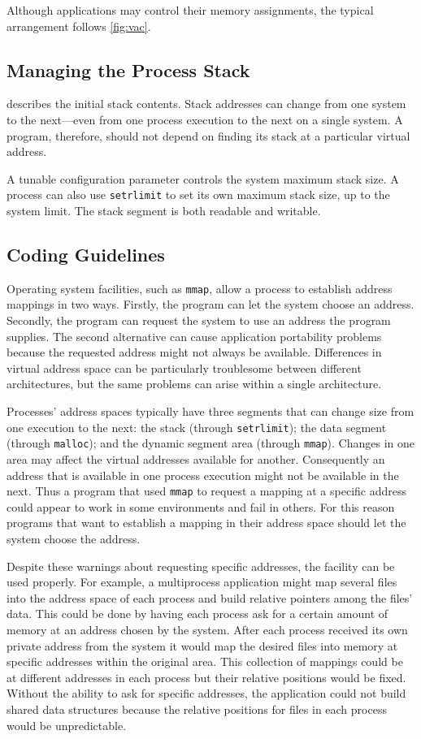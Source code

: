 \documentclass[english,11pt,twoside,toc=bib,toc=idx]{scrreprt}
\begin{document}
Although applications may control their memory assignments, the
typical arrangement follows \cref{fig:vac}.

\subsection{Managing the Process Stack}
 describes the initial stack contents.
Stack addresses can change from one system to the next---even from one
process execution to the next on a single system.  A program,
therefore, should not depend on finding its stack at a particular
virtual address.

A tunable configuration parameter controls the system maximum stack size.
A process can also use \texttt{setrlimit} to set its own maximum stack
size, up to the system limit.  The stack segment is both readable and
writable.

\subsection{Coding Guidelines}
Operating system facilities, such as \texttt{mmap}, allow a process to
establish address mappings in two ways.  Firstly, the program can let
the system choose an address.  Secondly, the program can request the
system to use an address the program supplies.  The second alternative
can cause application portability problems because the requested
address might not always be available.  Differences in virtual address
space can be particularly troublesome between different architectures,
but the same problems can arise within a single architecture.

Processes' address spaces typically have three segments that can
change size from one execution to the next: the stack (through
\texttt{setrlimit}); the data segment (through \texttt{malloc}); and
the dynamic segment area (through \texttt{mmap}).  Changes in one area
may affect the virtual addresses available for another.  Consequently
an address that is available in one process execution might not be
available in the next.  Thus a program that used \texttt{mmap} to
request a mapping at a specific address could appear to work in some
environments and fail in others.  For this reason programs that want
to establish a mapping in their address space should let the system
choose the address.

Despite these warnings about requesting specific addresses, the
facility can be used properly.  For example, a multiprocess
application might map several files into the address space of each
process and build relative pointers among the files' data.  This could
be done by having each process ask for a certain amount of memory at
an address chosen by the system.  After each process received its own
private address from the system it would map the desired files into
memory at specific addresses within the original area.  This
collection of mappings could be at different addresses in each process
but their relative positions would be fixed.  Without the ability to
ask for specific addresses, the application could not build shared
data structures because the relative positions for files in each
process would be unpredictable.
\end{document}
